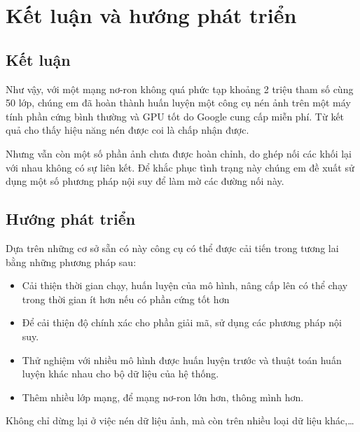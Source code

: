 \chapter{Kết luận và hướng phát triển}
\label{cha:chap4}

\section{Kết luận}

Như vậy, với một mạng nơ-ron không quá phức tạp khoảng 2 triệu tham số cùng 50 lớp, chúng em đã hoàn thành huấn luyện
một công cụ nén ảnh trên một máy tính phần cứng bình thường và GPU tốt do Google cung cấp miễn phí. Từ kết quả cho thấy
hiệu năng nén được coi là chấp nhận được.

Nhưng vẫn còn một số phần ảnh chưa được hoàn chỉnh, do ghép nối các khối lại với nhau không có sự liên kết. Để khắc phục tình trạng này
chúng em đề xuất sử dụng một số phương pháp nội suy để làm mờ các đường nối này.

\section{Hướng phát triển}

Dựa trên những cơ sở sẵn có này công cụ có thể được cải tiến trong
tương lai bằng những phương pháp sau:
\begin{itemize}
    \item Cải thiện thời gian chạy, huấn luyện của mô hình, nâng cấp lên có thể chạy trong thời gian ít hơn nếu có phần cứng tốt hơn
    \item Để cải thiện độ chính xác cho phần giải mã, sử dụng các phương pháp nội suy.
    \item Thử nghiệm với nhiều mô hình được huấn luyện trước và thuật toán huấn luyện khác nhau cho bộ dữ liệu của hệ thống.
    \item Thêm nhiều lớp mạng, để mạng nơ-ron lớn hơn, thông mình hơn.
\end{itemize}

Không chỉ dừng lại ở việc nén dữ liệu ảnh, mà còn trên nhiều loại dữ liệu khác,…



